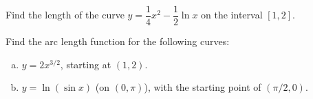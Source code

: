 \documentclass[notes]{subfiles}
\begin{document}
		\begin{ex}
			Find the length of the curve $y = \dfrac{1}{4}x^2 -\dfrac{1}{2}\ln x$ on the interval $[1,2]$.
		\end{ex}
			
		\begin{ex}
			Find the arc length function for the following curves:
			\begin{enumerate}[(a)]
				\item $y = 2x^{3/2}$, starting at $(1,2)$.
					
				\item $y = \ln (\sin x)$ (on $(0,\pi)$), with the starting point of $(\pi/2,0)$.
			\end{enumerate}
		\end{ex}
	
\clearpage
\end{document}
